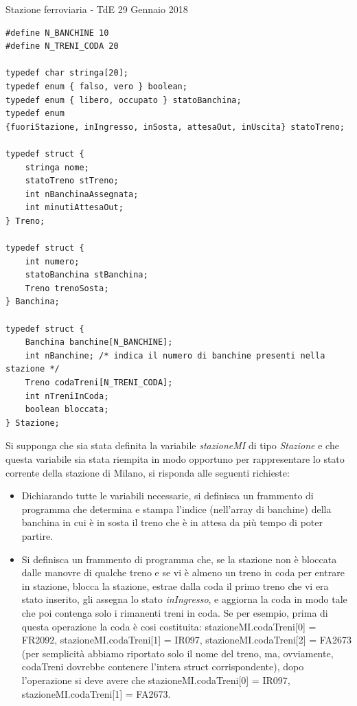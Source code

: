\documentclass[format=169, 10pt, handout]{beamer}
\begin{document}
\begin{frame}{Stazione ferroviaria - TdE 29 Gennaio 2018}
\begin{lstlisting}[style=CStyle, basicstyle=\small]
#define N_BANCHINE 10
#define N_TRENI_CODA 20

typedef char stringa[20];
typedef enum { falso, vero } boolean;
typedef enum { libero, occupato } statoBanchina;
typedef enum 
{fuoriStazione, inIngresso, inSosta, attesaOut, inUscita} statoTreno;

typedef struct {
    stringa nome;
    statoTreno stTreno;
    int nBanchinaAssegnata;
    int minutiAttesaOut;
} Treno;

typedef struct {
    int numero;
    statoBanchina stBanchina;
    Treno trenoSosta;
} Banchina;

typedef struct {
    Banchina banchine[N_BANCHINE];
    int nBanchine; /* indica il numero di banchine presenti nella stazione */
    Treno codaTreni[N_TRENI_CODA];
    int nTreniInCoda;
    boolean bloccata;
} Stazione;
\end{lstlisting}

Si supponga che sia stata definita la variabile \emph{stazioneMI} di tipo \emph{Stazione} e che questa variabile sia stata riempita in modo opportuno per rappresentare lo stato corrente della stazione di Milano, si risponda alle seguenti richieste:
\begin{itemize}
\item Dichiarando tutte le variabili necessarie, si definisca un frammento di programma che determina e stampa l'indice (nell’array di banchine) della banchina in cui è in sosta il treno che è in attesa da più tempo di poter partire.
\item Si definisca un frammento di programma che, se la stazione non è bloccata dalle manovre di qualche treno e se vi è almeno un treno in coda per entrare in stazione, blocca la stazione, estrae dalla coda il primo treno che vi era stato inserito, gli assegna lo stato \emph{inIngresso}, e aggiorna la coda in modo tale che poi contenga solo i rimanenti treni in coda. Se per esempio, prima di questa operazione la coda è cosi costituita: stazioneMI.codaTreni[0] = FR2092, stazioneMI.codaTreni[1] = IR097, stazioneMI.codaTreni[2] = FA2673 (per semplicità abbiamo riportato solo il nome del treno, ma, ovviamente, codaTreni dovrebbe contenere l’intera struct corrispondente), dopo l’operazione si deve avere che stazioneMI.codaTreni[0] = IR097, stazioneMI.codaTreni[1] = FA2673.
\end{itemize}
\end{frame}
\end{document}

